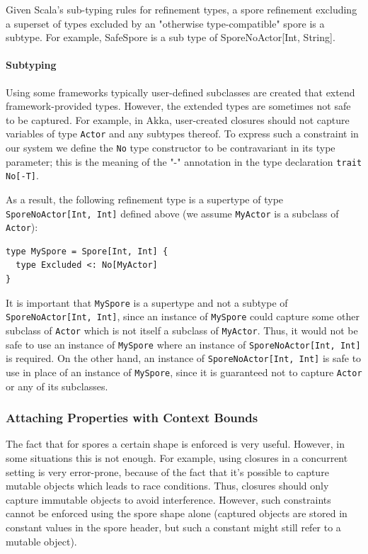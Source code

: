 \documentclass{llncs}
\begin{document}
Given Scala's sub-typing rules for refinement types, a spore refinement excluding a superset of types excluded by an "otherwise type-compatible" spore is a subtype. For example, SafeSpore is a sub type of SporeNoActor[Int, String].


\paragraph{Subtyping}

Using some frameworks typically user-defined subclasses are created that extend framework-provided types. However, the extended types are sometimes not safe to be captured. For example, in Akka, user-created closures should not capture variables of type \verb|Actor| and any subtypes thereof. To express such a constraint in our system we define the \verb|No| type constructor to be contravariant in its type parameter; this is the meaning of the "-" annotation in the type declaration \verb|trait No[-T]|.

As a result, the following refinement type is a supertype of type \verb|SporeNoActor[Int, Int]| defined above (we assume \verb|MyActor| is a subclass of \verb|Actor|):

\begin{lstlisting}
type MySpore = Spore[Int, Int] {
  type Excluded <: No[MyActor]
}
\end{lstlisting}
\noindent
It is important that \verb|MySpore| is a supertype and not a subtype of \verb|SporeNoActor[Int, Int]|, since an instance of \verb|MySpore| could capture some other subclass of \verb|Actor| which is not itself a subclass of \verb|MyActor|. Thus, it would not be safe to use an instance of \verb|MySpore| where an instance of \verb|SporeNoActor[Int, Int]| is required. On the other hand, an instance of \verb|SporeNoActor[Int, Int]| is safe to use in place of an instance of \verb|MySpore|, since it is guaranteed not to capture \verb|Actor| or any of its subclasses.


\subsubsection{Attaching Properties with Context Bounds}

The fact that for spores a certain shape is enforced is very useful. However, in some situations this is not enough. For example, using closures in a concurrent setting is very error-prone, because of the fact that it's possible to capture mutable objects which leads to race conditions. Thus, closures should only capture immutable objects to avoid interference. However, such constraints cannot be enforced using the spore shape alone (captured objects are stored in constant values in the spore header, but such a constant might still refer to a mutable object).
\end{document}
